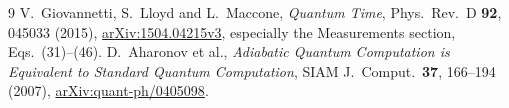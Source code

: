 \documentclass[11pt,a4paper]{article}
\begin{document}
\begin{thebibliography}{9}
V.~Giovannetti, S.~Lloyd and L.~Maccone,
\emph{Quantum Time}, Phys.\ Rev.\ D \textbf{92}, 045033 (2015),
\href{https://arxiv.org/abs/1504.04215v3}{arXiv:1504.04215v3},
especially the Measurements section, Eqs.~(31)--(46).
D.~Aharonov et al.,
\emph{Adiabatic Quantum Computation is Equivalent to Standard
Quantum Computation}, SIAM J.\ Comput.\ \textbf{37}, 166--194 (2007),
\href{https://arxiv.org/abs/quant-ph/0405098}{arXiv:quant-ph/0405098}.
\end{thebibliography}
\end{document}
